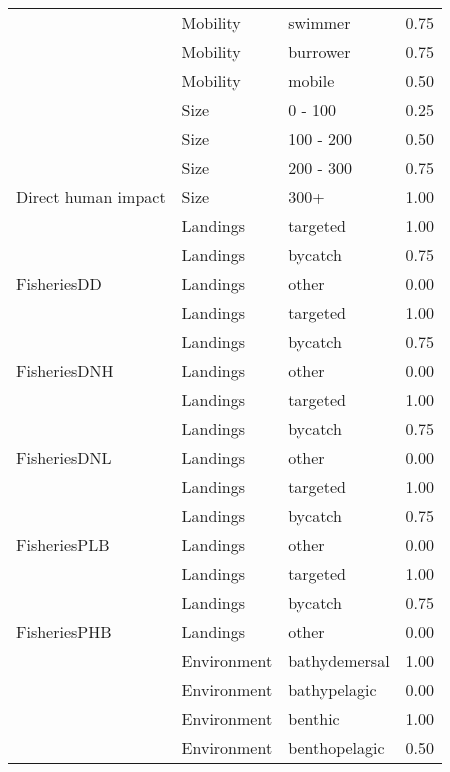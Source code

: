 \documentclass[
  12pt,
]{article}
\begin{document}
\begin{longtable}{llll}
\cmidrule{2-4}
 & Mobility & swimmer & 0.75\\
\cmidrule{2-4}
 & Mobility & burrower & 0.75\\
\cmidrule{2-4}
 & Mobility & mobile & 0.50\\
\cmidrule{2-4}
 & Size & 0 - 100 & 0.25\\
\cmidrule{2-4}
 & Size & 100 - 200 & 0.50\\
\cmidrule{2-4}
 & Size & 200 - 300 & 0.75\\
\cmidrule{2-4}
\multirow{-9}{*}{\raggedright\arraybackslash Direct human impact} & Size & 300+ & 1.00\\
\cmidrule{1-4}
 & Landings & targeted & 1.00\\
\cmidrule{2-4}
 & Landings & bycatch & 0.75\\
\cmidrule{2-4}
\multirow{-3}{*}{\raggedright\arraybackslash FisheriesDD} & Landings & other & 0.00\\
\cmidrule{1-4}
 & Landings & targeted & 1.00\\
\cmidrule{2-4}
 & Landings & bycatch & 0.75\\
\cmidrule{2-4}
\multirow{-3}{*}{\raggedright\arraybackslash FisheriesDNH} & Landings & other & 0.00\\
\cmidrule{1-4}
 & Landings & targeted & 1.00\\
\cmidrule{2-4}
 & Landings & bycatch & 0.75\\
\cmidrule{2-4}
\multirow{-3}{*}{\raggedright\arraybackslash FisheriesDNL} & Landings & other & 0.00\\
\cmidrule{1-4}
 & Landings & targeted & 1.00\\
\cmidrule{2-4}
 & Landings & bycatch & 0.75\\
\cmidrule{2-4}
\multirow{-3}{*}{\raggedright\arraybackslash FisheriesPLB} & Landings & other & 0.00\\
\cmidrule{1-4}
 & Landings & targeted & 1.00\\
\cmidrule{2-4}
 & Landings & bycatch & 0.75\\
\cmidrule{2-4}
\multirow{-3}{*}{\raggedright\arraybackslash FisheriesPHB} & Landings & other & 0.00\\
\cmidrule{1-4}
 & Environment & bathydemersal & 1.00\\
\cmidrule{2-4}
 & Environment & bathypelagic & 0.00\\
\cmidrule{2-4}
 & Environment & benthic & 1.00\\
\cmidrule{2-4}
 & Environment & benthopelagic & 0.50\\
\cmidrule{2-4}

\end{longtable}
\end{document}
